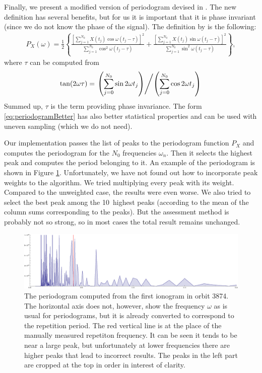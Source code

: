 Finally, we present a modified version of periodogram devised in \citep{Scargle1982}. The new definition has several benefits, but for us it is important that it is phase invariant (since we do not know the phase of the signal). The definition by \citep[p.~838]{Scargle1982} is the following:
\begin{align}
P_X(\omega) = \frac{1}{2} \left\lbrace \frac{\left[ \sum\limits_{j=1}^{N_0} X(t_j)\cos\omega (t_j - \tau) \right]^2}{\sum\limits_{j=1}^{N_0} \cos^2\omega (t_j - \tau)} + \frac{\left[\sum\limits_{j=1}^{N_0} X(t_j)\sin\omega (t_j - \tau) \right]^2}{\sum\limits_{j=1}^{N_0} \sin^2\omega (t_j - \tau)} \right\rbrace,
\label{eq:periodogramBetter}
\end{align} 
where $\tau$ can be computed from
\begin{align}
\tan(2\omega\tau) = \left. \left(\sum\limits_{j=0}^{N_0} \sin 2\omega t_j \right) \middle/ \left(\sum\limits_{j=0}^{N_0} \cos 2\omega t_j \right) \right.
\end{align} 
Summed up, $\tau$ is the term providing phase invariance. The form \eqref{eq:periodogramBetter} has also better statistical properties and can be used with uneven sampling (which we do not need)\citep[p.~849]{Scargle1982}.

Our implementation passes the list of peaks to the periodogram function $P_X$ and computes the periodogram for the $N_0$ frequencies $\omega_n$. Then it selects the highest peak and computes the period belonging to it. An example of the periodogram is shown in Figure \ref{fig:periodogram}. Unfortunately, we have not found out how to incorporate peak weights to the algorithm. We tried multiplying every peak with its weight. Compared to the unweighted case, the results were even worse. We also tried to select the best peak among the 10~highest peaks (according to the mean of the column sums corresponding to the peaks). But the assessment method is probably not so strong, so in most cases the total result remains unchanged. 

\begin{figure}
	\centering
	\includegraphics[width=140mm]{images/periodogram_from_normalized_peaks_orbit_3874_000.eps}
	\caption{The periodogram computed from the first ionogram in orbit 3874. The horizontal axis does not, however, show the frequency $\omega$ as is usual for periodograms, but it is already converted to correspond to the repetition period. The red vertical line is at the place of the manually measured repetiton frequency. It can be seen it tends to be near a large peak, but unfortunately at lower frequencies there are higher peaks that lead to incorrect results. The peaks in the left part are cropped at the top in order in interest of clarity.}
	\label{fig:periodogram}
\end{figure}
 
